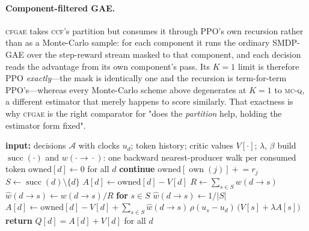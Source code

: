 \documentclass[review,authoryear,3p,times]{elsarticle}
\newcommand{\cflow}{\textsc{cgae-cf}}          %
\newcommand{\ccf}{\textsc{ccf}}
\newcommand{\mcq}{\textsc{mc-q}}
\newcommand{\cfgae}{\textsc{cfgae}}
\newcommand{\Ascr}{\mathcal{A}}
\newcommand{\suc}{\operatorname{succ}}
\newcommand{\own}{\operatorname{own}}
\begin{document}
\paragraph{Component-filtered GAE.}
\cfgae{} takes \ccf's partition but consumes it through PPO's own recursion
rather than as a Monte-Carlo sample: for each component it runs the ordinary
SMDP-GAE over the step-reward stream masked to that component, and each decision
reads the advantage from its own component's pass. Its $K=1$ limit is therefore
PPO \emph{exactly}---the mask is identically one and the recursion is
term-for-term PPO's---whereas every Monte-Carlo scheme above degenerates at
$K=1$ to \mcq, a different estimator that merely happens to score similarly.
That exactness is why \cfgae{} is the right comparator for "does the
\emph{partition} help, holding the estimator form fixed".

\begin{algorithm}[tbp]
\caption{Causal-order advantage estimation (\cflow)}
\label{alg:cflow}
\begin{algorithmic}[1]
\State \textbf{input:} decisions $\Ascr$ with clocks $u_d$; token history;
       critic values $V[\cdot]$; $\lambda$, $\beta$
\State build $\suc(\cdot)$ and $w(\cdot\!\to\!\cdot)$: one backward
       nearest-producer walk per consumed token
\State $\mathrm{owned}[d]\gets 0$ for all $d$
  \If{$\Ascr(j)=\emptyset$}
    \State \textbf{continue} 
  \EndIf
  \State $\mathrm{owned}[\own(j)] \mathrel{+}= r_j$
\EndFor
\ForAll{$d\in\Ascr$ in decreasing $u_d$}
  \State $S \gets \suc(d)\setminus\{d\}$
    \State $A[d]\gets \mathrm{owned}[d]-V[d]$ 
  \Else
    \State $R\gets\sum_{s\in S} w(d\!\to\!s)$
      \State $\hat w(d\!\to\!s)\gets w(d\!\to\!s)/R$ \textbf{for} $s\in S$
    \Else
      \State $\hat w(d\!\to\!s)\gets 1/|S|$
    \EndIf
    \State $A[d]\gets \mathrm{owned}[d]-V[d]
            +\sum_{s\in S} \hat w(d\!\to\!s)\,\rho(u_s\!-\!u_d)\,
             \bigl(V[s]+\lambda A[s]\bigr)$
  \EndIf
\EndFor
\State \textbf{return} $Q[d]=A[d]+V[d]$ for all $d$
\end{algorithmic}
\end{algorithm}
\end{document}
